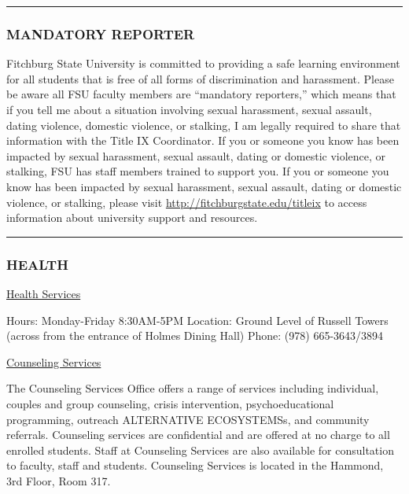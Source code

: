 \documentclass[]{tufte-handout}
\begin{document}
\begin{center}\rule{0.5\linewidth}{0.5pt}\end{center}

\hypertarget{mandatory-reporter}{%
\subsubsection{MANDATORY REPORTER}\label{mandatory-reporter}}

Fitchburg State University is committed to providing a safe learning
environment for all students that is free of all forms of discrimination
and harassment. Please be aware all FSU faculty members are ``mandatory
reporters,'' which means that if you tell me about a situation involving
sexual harassment, sexual assault, dating violence, domestic violence,
or stalking, I am legally required to share that information with the
Title IX Coordinator. If you or someone you know has been impacted by
sexual harassment, sexual assault, dating or domestic violence, or
stalking, FSU has staff members trained to support you. If you or
someone you know has been impacted by sexual harassment, sexual assault,
dating or domestic violence, or stalking, please visit
\url{http://fitchburgstate.edu/titleix} to access information about
university support and resources.

\begin{center}\rule{0.5\linewidth}{0.5pt}\end{center}

\hypertarget{health}{%
\subsubsection{HEALTH}\label{health}}

\href{http://www.google.com/url?q=http\%3A\%2F\%2Fwww.fitchburgstate.edu\%2Foffices-services-directory\%2Fhealth-services\%2F\&sa=D\&sntz=1\&usg=AFQjCNEw5V0i0hL5DVO5b43gejNNaAt4ig}{Health
Services}

Hours: Monday-Friday 8:30AM-5PM Location: Ground Level of Russell Towers
(across from the entrance of Holmes Dining Hall) Phone: (978)
665-3643/3894

\href{http://www.google.com/url?q=http\%3A\%2F\%2Fwww.fitchburgstate.edu\%2Foffices-services-directory\%2Fcounseling-services\%2F\&sa=D\&sntz=1\&usg=AFQjCNEYiS4EmSvWerpp2bKr5lTpouPuqQ}{Counseling
Services}

The Counseling Services Office offers a range of services including
individual, couples and group counseling, crisis intervention,
psychoeducational programming, outreach ALTERNATIVE ECOSYSTEMSs, and
community referrals. Counseling services are confidential and are
offered at no charge to all enrolled students. Staff at Counseling
Services are also available for consultation to faculty, staff and
students. Counseling Services is located in the Hammond, 3rd Floor, Room
317.
\end{document}
